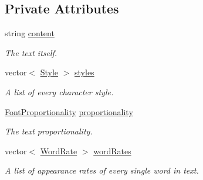 \subsection*{Private Attributes}
\begin{CompactItemize}
\item 
\hypertarget{class_text_16a34f9fe1c7a3c025ef16e9999c4882}{
string \hyperlink{class_text_16a34f9fe1c7a3c025ef16e9999c4882}{content}}
\label{class_text_16a34f9fe1c7a3c025ef16e9999c4882}

\begin{CompactList}\small\item\em The text itself. \item\end{CompactList}\item 
\hypertarget{class_text_2c322226122eeb533c267eeeef8d4a4d}{
vector$<$ \hyperlink{class_style}{Style} $>$ \hyperlink{class_text_2c322226122eeb533c267eeeef8d4a4d}{styles}}
\label{class_text_2c322226122eeb533c267eeeef8d4a4d}

\begin{CompactList}\small\item\em A list of every character style. \item\end{CompactList}\item 
\hypertarget{class_text_e0471b8ee4689550703105ebcb63bad6}{
\hyperlink{_font_proportionality_8h_a9aa255df24db58a9b4cbc46941f2ac1}{FontProportionality} \hyperlink{class_text_e0471b8ee4689550703105ebcb63bad6}{proportionality}}
\label{class_text_e0471b8ee4689550703105ebcb63bad6}

\begin{CompactList}\small\item\em The text proportionality. \item\end{CompactList}\item 
\hypertarget{class_text_7505af95f67166479797a8863f8043cd}{
vector$<$ \hyperlink{_word_rate_8h_e8f43926daba5798edbb3cb94ad07ff7}{WordRate} $>$ \hyperlink{class_text_7505af95f67166479797a8863f8043cd}{wordRates}}
\label{class_text_7505af95f67166479797a8863f8043cd}

\begin{CompactList}\small\item\em A list of appearance rates of every single word in text. \item\end{CompactList}\end{CompactItemize}


